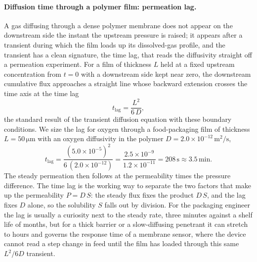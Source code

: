 

\paragraph{Diffusion time through a polymer film: permeation lag.} A gas
diffusing through a dense polymer membrane does not appear on the downstream
side the instant the upstream pressure is raised; it appears after a transient
during which the film loads up its dissolved-gas profile, and the transient
has a clean signature, the time lag, that reads the diffusivity straight off a
permeation experiment. For a film of thickness $L$ held at a fixed upstream
concentration from $t = 0$ with a downstream side kept near zero, the
downstream cumulative flux approaches a straight line whose backward extension
crosses the time axis at the time lag
\[
t_{\text{lag}} = \frac{L^2}{6\,D},
\]
the standard result of the transient diffusion equation with these boundary
conditions. We size the lag for oxygen through a food-packaging film of
thickness $L = 50\,\si{\micro\meter}$ with an oxygen diffusivity in the
polymer $D = 2.0\times 10^{-12}\,\si{\meter\squared\per\second}$,
\[
t_{\text{lag}} = \frac{(5.0\times 10^{-5})^2}{6\,(2.0\times 10^{-12})} =
\frac{2.5\times 10^{-9}}{1.2\times 10^{-11}} = 208\,\text{s} \approx
3.5\,\text{min}.
\]
The steady permeation then follows at the permeability times the
pressure difference. The time lag is the working way to separate the two
factors that make up the permeability $P = D\,S$: the steady flux fixes the
product $D\,S$, and the lag fixes $D$ alone, so the solubility $S$ falls out
by division. For the packaging engineer the lag is usually a curiosity next
to the steady rate, three minutes against a shelf life of months, but for a
thick barrier or a slow-diffusing penetrant it can stretch to hours and
governs the response time of a membrane sensor, where the device cannot read
a step change in feed until the film has loaded through this same $L^2/6D$
transient.

